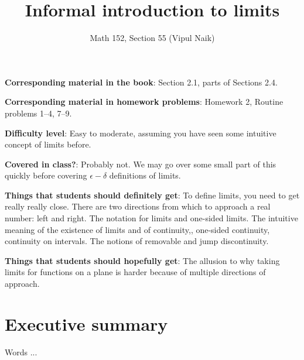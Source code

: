 \documentclass[10pt]{amsart}
\title{Informal introduction to limits}
\author{Math 152, Section 55 (Vipul Naik)}
\begin{document}
\maketitle

{\bf Corresponding material in the book}: Section 2.1, parts of
Sections 2.4.

{\bf Corresponding material in homework problems}: Homework 2,
Routine problems 1--4, 7--9.

{\bf Difficulty level}: Easy to moderate, assuming you have seen some
intuitive concept of limits before.

{\bf Covered in class?}: Probably not. We may go over some small part
of this quickly before covering $\epsilon-\delta$ definitions of
limits.

{\bf Things that students should definitely get}: To define limits,
you need to get really really close. There are two directions from
which to approach a real number: left and right. The notation for
limits and one-sided limits. The intuitive meaning of the existence of
limits and of continuity,, one-sided continuity, continuity on
intervals. The notions of removable and jump discontinuity.

{\bf Things that students should hopefully get}: The allusion to why
taking limits for functions on a plane is harder because of multiple
directions of approach.

\section*{Executive summary}

Words ...
\end{document}
